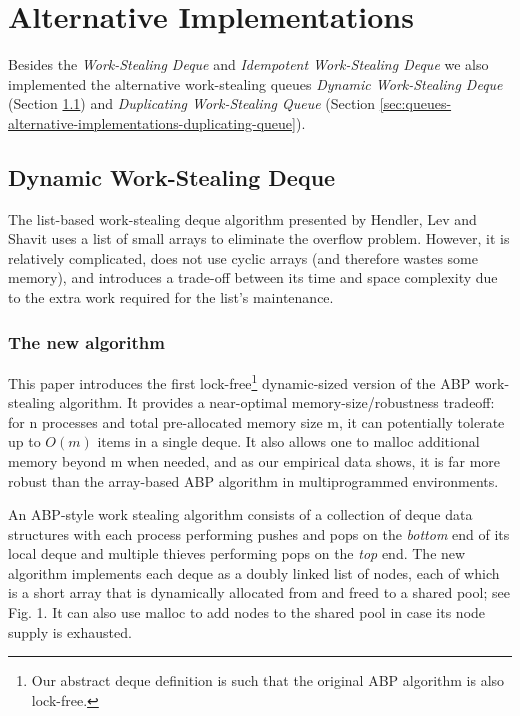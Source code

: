 


\section{Alternative Implementations}
\label{sec:queues-alternative-implementations}

Besides the \emph{Work-Stealing Deque} and \emph{Idempotent
  Work-Stealing Deque} we also implemented the alternative
work-stealing queues \emph{Dynamic Work-Stealing Deque} (Section
\ref{sec:queues-alternative-implementations-dynamic-deque}) and
\emph{Duplicating Work-Stealing Queue} (Section
\ref{sec:queues-alternative-implementations-duplicating-queue}).

\subsection{Dynamic Work-Stealing Deque}
\label{sec:queues-alternative-implementations-dynamic-deque}

The list-based work-stealing deque algorithm presented by Hendler, Lev
and Shavit \cite{Hendler2006, Hendler2006a} uses a list of small
arrays to eliminate the overflow problem. However, it is relatively
complicated, does not use cyclic arrays (and therefore wastes some
memory), and introduces a trade-off between its time and space
complexity due to the extra work required for the list's maintenance.

\subsubsection{The new algorithm}

This paper introduces the first lock-free\footnote{Our abstract deque
  definition is such that the original ABP algorithm is also
  lock-free.} dynamic-sized version of the ABP work-stealing
algorithm. It provides a near-optimal memory-size/robustness tradeoff:
for n processes and total pre-allocated memory size m, it can
potentially tolerate up to $O(m)$ items in a single deque. It also
allows one to malloc additional memory beyond m when needed, and as
our empirical data shows, it is far more robust than the array-based
ABP algorithm in multiprogrammed environments.

An ABP-style work stealing algorithm consists of a collection of deque
data structures with each process performing pushes and pops on the
\emph{bottom} end of its local deque and multiple thieves performing pops
on the \emph{top} end. The new algorithm implements each deque as a
doubly linked list of nodes, each of which is a short array that is
dynamically allocated from and freed to a shared pool; see Fig. 1. It
can also use malloc to add nodes to the shared pool in case its node
supply is exhausted.

